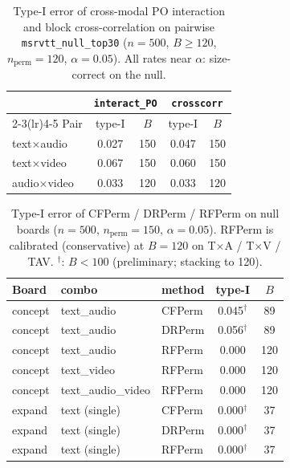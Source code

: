 
\begin{table}[t]
\centering\small\setlength{\tabcolsep}{5pt}
\caption{Type-I error of cross-modal PO interaction and block cross-correlation
  on pairwise \texttt{msrvtt\_null\_top30}
  ($n=500$, $B\ge 120$, $n_{\mathrm{perm}}=120$, $\alpha=0.05$).
  All rates near $\alpha$: size-correct on the null.}
\label{tab:typeI-po-crosscorr}
\begin{tabular}{l cc cc}
\toprule
& \multicolumn{2}{c}{\texttt{interact\_PO}} & \multicolumn{2}{c}{\texttt{crosscorr}} \\
\cmidrule(lr){2-3}\cmidrule(lr){4-5}
Pair & type-I & $B$ & type-I & $B$ \\
\midrule
text$\times$audio & 0.027 & 150 & 0.047 & 150 \\
text$\times$video & 0.067 & 150 & 0.060 & 150 \\
audio$\times$video & 0.033 & 120 & 0.033 & 120 \\
\bottomrule
\end{tabular}
\end{table}

\begin{table}[t]
\centering\small\setlength{\tabcolsep}{4pt}
\caption{Type-I error of CFPerm / DRPerm / RFPerm on null boards
  ($n=500$, $n_{\mathrm{perm}}=150$, $\alpha=0.05$).
  RFPerm is calibrated (conservative) at $B=120$ on T$\times$A / T$\times$V / TAV.
  $^\dagger$: $B<100$ (preliminary; stacking to 120).}
\label{tab:typeI-cfdr-rf}
\begin{tabular}{l ll cc}
\toprule
Board & combo & method & type-I & $B$ \\
\midrule
concept & text\_audio & CFPerm & 0.045$^\dagger$ & 89 \\
concept & text\_audio & DRPerm & 0.056$^\dagger$ & 89 \\
concept & text\_audio & RFPerm & 0.000 & 120 \\
concept & text\_video & RFPerm & 0.000 & 120 \\
concept & text\_audio\_video & RFPerm & 0.000 & 120 \\
expand & text (single) & CFPerm & 0.000$^\dagger$ & 37 \\
expand & text (single) & DRPerm & 0.000$^\dagger$ & 37 \\
expand & text (single) & RFPerm & 0.000$^\dagger$ & 37 \\
\bottomrule
\end{tabular}
\end{table}

